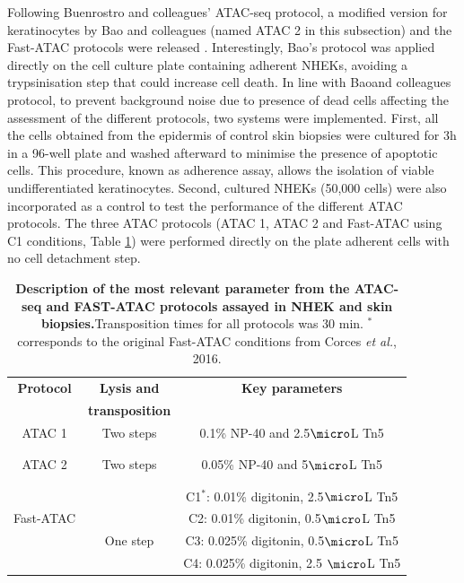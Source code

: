 Following Buenrostro and colleagues' ATAC-seq protocol, a modified version for keratinocytes by Bao and colleagues (named ATAC 2 in this subsection) and the Fast-ATAC protocols were released \parencite{Bao2015, Corces2016}. Interestingly, Bao's protocol was applied directly on the cell culture plate containing adherent NHEKs, avoiding a trypsinisation step that could increase cell death. In line with Baoand colleagues protocol, to prevent background noise due to presence of dead cells affecting the assessment of the different protocols, two systems were implemented. First, all the cells obtained from the epidermis of control skin biopsies were cultured for 3h in a 96-well plate and washed afterward to minimise the presence of apoptotic cells. This procedure, known as adherence assay, allows the isolation of viable undifferentiated keratinocytes. Second, cultured NHEKs (50,000 cells) were also incorporated as a control to test the performance of the different ATAC protocols. The three ATAC protocols (ATAC 1, ATAC 2 and Fast-ATAC using C1 conditions, Table \ref{tab:ATAC_skin_optimisation_protocols}) were performed directly on the plate adherent cells with no cell detachment step. 



\begin{table}[htbp]
\begin{tabular}{@{} c c c}
\toprule
\textbf{Protocol}   & \textbf{Lysis and} & \textbf{Key parameters} \\
                    & \textbf{transposition} &  \\
\midrule
\midrule
ATAC 1          & Two steps & 0.1\% NP-40 and 2.5$\micro$L Tn5  \\
\parencite{Buenrostro2013} && \\
&&\\
ATAC 2          &Two steps   & 0.05\% NP-40 and 5$\micro$L Tn5  \\
\parencite{Bao2015} &&\\
&&\\
                                 &             & C1$^\ast$: 0.01\% digitonin, 2.5$\micro$L Tn5 \\
 Fast-ATAC                       &             & C2: 0.01\% digitonin, 0.5$\micro$L Tn5 \\
\parencite{Corces2016}           & One step    & C3: 0.025\% digitonin, 0.5$\micro$L Tn5 \\
													       &             & C4: 0.025\% digitonin, 2.5 $\micro$L Tn5 \\
\bottomrule
\end{tabular}
\medskip %
\caption[Description of the most relevant parameter from the ATAC-seq and FAST-ATAC protocols assayed in NHEK and skin biopsies.]{\textbf{Description of the most relevant parameter from the ATAC-seq and FAST-ATAC protocols assayed in NHEK and skin biopsies.}Transposition times for all protocols was 30 min. $^\ast$ corresponds to the original Fast-ATAC conditions from Corces \textit{et al.}, 2016.}
\label{tab:ATAC_skin_optimisation_protocols}
\end{table}
\bigskip %

